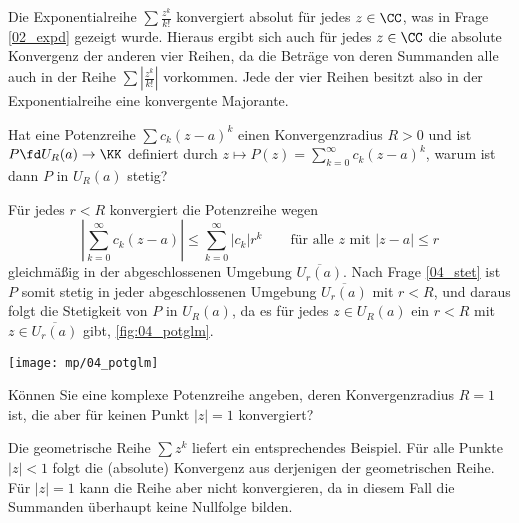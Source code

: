 \begin{antwort}
Die Exponentialreihe $\sum \frac{z^k}{k!}$ 
konvergiert absolut für jedes $z\in \CC$, was in Frage 
\ref{02_expd} gezeigt wurde. 
Hieraus ergibt sich auch für jedes $z\in \CC$ die absolute 
Konvergenz der anderen vier Reihen, da die Beträge von deren Summanden 
alle auch in der Reihe $\sum \left| \frac{z^k}{k!}\right|$ vorkommen. 
Jede der vier Reihen besitzt also in der Exponentialreihe eine konvergente 
Majorante.   
\AntEnd
\end{antwort}

\begin{frage}\label{04_glpo}
Hat eine Potenzreihe $\sum c_k (z-a)^k$ einen Konvergenzradius 
$R>0$ und ist $P\fd U_R(a) \to \KK$ definiert durch $
 z\mapsto P(z) = \sum_{k=0}^\infty c_k( z-a )^k$, 
warum ist dann $P$ in $U_R(a)$ stetig?
\end{frage}

\begin{antwort}
 Für jedes $r<R$ konvergiert die Potenzreihe wegen 
\[
\left| \sum_{k=0}^\infty c_k (z-a) \right| 
\le \sum_{k=0}^\infty |c_k| r^k 
\qquad\text{für alle $z$ mit $|z-a|\le r$}
\] 
gleichmäßig in der abgeschlossenen Umgebung 
$\overline{U_r (a)}$. Nach Frage \ref{04_stet} ist $P$ somit stetig 
in jeder abgeschlossenen Umgebung $\overline{U_r (a)}$ mit $r<R$, 
und daraus folgt die Stetigkeit von $P$ in  $U_R(a)$, da es für jedes 
$z\in U_R( a )$ ein $r<R$ mit $z\in  \overline{U_r (a)}$ gibt, 
\sieheAbbildung\ref{fig:04_potglm}.
\AntEnd

\begin{center}
  \texttt{[image: mp/04\_potglm]}
  \label{fig:04_potglm}
\end{center}
\end{antwort} 

\begin{frage}
Können Sie eine komplexe Potenzreihe angeben, deren Konvergenzradius 
$R=1$ ist, die aber für keinen Punkt $|z|=1$ konvergiert?
\end{frage}

\begin{antwort}
Die geometrische Reihe $\sum z^{k}$
liefert ein entsprechendes Beispiel. 
Für alle Punkte $|z|<1$ folgt die (absolute) Konvergenz aus derjenigen 
der geometrischen Reihe. Für $|z|=1$ kann die Reihe aber nicht konvergieren, 
da in diesem Fall die Summanden überhaupt keine Nullfolge bilden. 
\AntEnd
\end{antwort}


